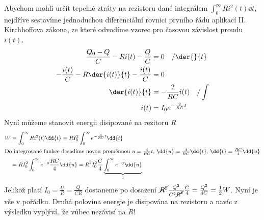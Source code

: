 \begin{mdframed}[style=mdexam]
\begin{example}
    Abychom mohli určit tepelné ztráty na rezistoru dané integrálem \(\int_{0}^{\infty}
    Ri^2(t)\dd{t}\), nejdříve sestavíme jednoduchou diferenciální rovnici prvního řádu aplikací II.
    Kirchhoffova zákona, ze které odvodíme vzorec pro časovou závislost proudu \(i(t)\). 
    \begin{align*}
      \frac{Q_0 - Q}{C} - Ri(t) - \frac{Q}{C}           &= 0 \quad/\der{ }{t}             \\
      -\frac{i(t)}{C} - R\der{i(t)}{t} - \frac{i(t)}{C} &= 0                              \\
                                          \der{i(t)}{t} &= - \frac{2}{RC}i(t) \quad/\int  \\
                                                   i(t) &= I_0e^{-\frac{2}{RC}t}
    \end{align*}
    Nyní můžeme stanovit energii disipované na rezitoru \(R\)
    \begin{align*}
      W   &= \int_{0}^{\infty}Ri^2(t)\dd{t} = RI_0^2\int_{0}^{\infty}e^{-\frac{4}{RC}t}\dd{t}   \\
      \shortintertext{Do integrované funkce dosadíme novou proměnnou \(u = \frac{4}{RC}t\), \(\dd{u} 
                      = \frac{4}{RC}\dd{t}\), \(\dd{t} = \frac{RC}{4}\dd{u}\)}
          &= RI_0^2\int_{0}^{\infty}e^{-u}\frac{RC}{4}\dd{u} 
          = R^2I_0^2\frac{C}{4}\underbrace{\int_{0}^{\infty}e^{-u}\dd{u}}_1 
      \end{align*}
    Jelikož platí \(I_0 = \frac{U}{R}=\frac{Q}{CR}\) dostaneme po dosazení
    \(\cancel{R^2}\frac{Q^2}{C^2\cancel{R^2}}\frac{C}{4} = \frac{Q^2}{4C}= \frac{1}{2}W\). Nyní je
    vše v pořádku. Druhá polovina energie je disipována na rezistoru a navíc z výsledku vyplývá, že
    vůbec nezávisí na \(R\)!
  \end{example}
\end{mdframed}